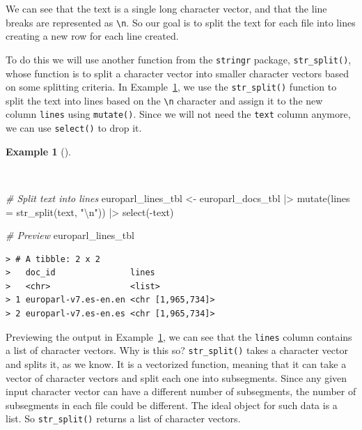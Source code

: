 \documentclass[
  letterpaper,
  DIV=11,
  numbers=noendperiod]{scrreport}
\newenvironment{Shaded}{\begin{snugshade}}{\end{snugshade}}
\newcommand{\AttributeTok}[1]{\textcolor[rgb]{0.00,0.00,0.00}{#1}}
\newcommand{\CommentTok}[1]{\textcolor[rgb]{0.00,0.00,0.00}{\textit{#1}}}
\newcommand{\FunctionTok}[1]{\textcolor[rgb]{0.00,0.00,0.00}{#1}}
\newcommand{\NormalTok}[1]{\textcolor[rgb]{0.00,0.00,0.00}{#1}}
\newcommand{\OtherTok}[1]{\textcolor[rgb]{0.00,0.00,0.00}{#1}}
\newcommand{\SpecialCharTok}[1]{\textcolor[rgb]{0.00,0.00,0.00}{#1}}
\newcommand{\StringTok}[1]{\textcolor[rgb]{0.00,0.00,0.00}{#1}}
\theoremstyle{definition}
\newtheorem{example}{Example}[chapter]
\theoremstyle{remark}
\begin{document}
We can see that the text is a single long character vector, and that the
line breaks are represented as \texttt{\textbackslash{}n}. So our goal
is to split the text for each file into lines creating a new row for
each line created.

To do this we will use another function from the \texttt{stringr}
package, \texttt{str\_split()}, whose function is to split a character
vector into smaller character vectors based on some splitting criteria.
In Example~\ref{exm-cd-europarl-text-lines-tbl}, we use the
\texttt{str\_split()} function to split the text into lines based on the
\texttt{\textbackslash{}n} character and assign it to the new column
\texttt{lines} using \texttt{mutate()}. Since we will not need the
\texttt{text} column anymore, we can use \texttt{select()} to drop it.

\begin{example}[]\protect\hypertarget{exm-cd-europarl-text-lines-tbl}{}\label{exm-cd-europarl-text-lines-tbl}

~

\begin{Shaded}
\begin{Highlighting}[]
\CommentTok{\# Split text into lines}
\NormalTok{europarl\_lines\_tbl }\OtherTok{\textless{}{-}} 
\NormalTok{  europarl\_docs\_tbl }\SpecialCharTok{|\textgreater{}} 
  \FunctionTok{mutate}\NormalTok{(}\AttributeTok{lines =} \FunctionTok{str\_split}\NormalTok{(text, }\StringTok{"}\SpecialCharTok{\textbackslash{}n}\StringTok{"}\NormalTok{)) }\SpecialCharTok{|\textgreater{}} 
  \FunctionTok{select}\NormalTok{(}\SpecialCharTok{{-}}\NormalTok{text)}

\CommentTok{\# Preview}
\NormalTok{europarl\_lines\_tbl}
\end{Highlighting}
\end{Shaded}

\begin{verbatim}
> # A tibble: 2 x 2
>   doc_id               lines            
>   <chr>                <list>           
> 1 europarl-v7.es-en.en <chr [1,965,734]>
> 2 europarl-v7.es-en.es <chr [1,965,734]>
\end{verbatim}

\end{example}

Previewing the output in Example~\ref{exm-cd-europarl-text-lines-tbl},
we can see that the \texttt{lines} column contains a list of character
vectors. Why is this so? \texttt{str\_split()} takes a character vector
and splits it, as we know. It is a vectorized function, meaning that it
can take a vector of character vectors and split each one into
subsegments. Since any given input character vector can have a different
number of subsegments, the number of subsegments in each file could be
different. The ideal object for such data is a list. So
\texttt{str\_split()} returns a list of character vectors.
\end{document}
